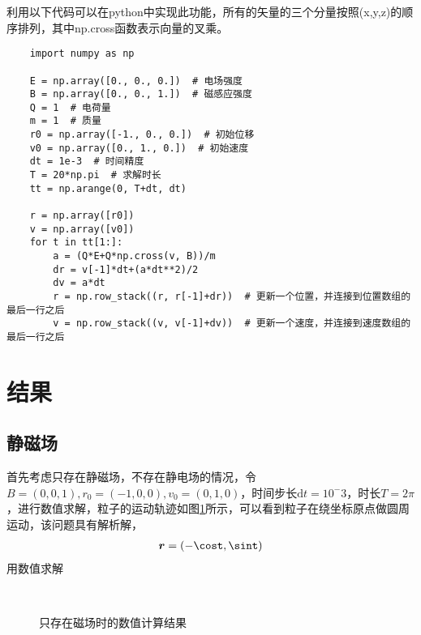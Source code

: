 \documentclass{article} %
\renewcommand{\vec}[1]{\boldsymbol{#1}} %
\begin{document}
利用以下代码可以在python中实现此功能，所有的矢量的三个分量按照(x,y,z)的顺序排列，其中np.cross函数表示向量的叉乘。
\begin{lstlisting}
    import numpy as np
    
    E = np.array([0., 0., 0.])  # 电场强度
    B = np.array([0., 0., 1.])  # 磁感应强度
    Q = 1  # 电荷量
    m = 1  # 质量
    r0 = np.array([-1., 0., 0.])  # 初始位移
    v0 = np.array([0., 1., 0.])  # 初始速度
    dt = 1e-3  # 时间精度
    T = 20*np.pi  # 求解时长
    tt = np.arange(0, T+dt, dt)
    
    r = np.array([r0])
    v = np.array([v0])
    for t in tt[1:]:
        a = (Q*E+Q*np.cross(v, B))/m
        dr = v[-1]*dt+(a*dt**2)/2
        dv = a*dt
        r = np.row_stack((r, r[-1]+dr))  # 更新一个位置，并连接到位置数组的最后一行之后
        v = np.row_stack((v, v[-1]+dv))  # 更新一个速度，并连接到速度数组的最后一行之后
    \end{lstlisting}

\section{结果}

\subsection{静磁场}
首先考虑只存在静磁场，不存在静电场的情况，令$B=(0,0,1),r_0=(-1,0,0),v_0=(0,1,0)$，时间步长$\mathrm{d}t=10^-3$，时长$T=2\pi$，进行数值求解，粒子的运动轨迹如图\ref{F2}所示，可以看到粒子在绕坐标原点做圆周运动，该问题具有解析解，
\begin{align}
    \vec{r}=(-\cost,\sint)
\end{align}
用数值求解
\begin{figure}
    \\
    \caption{只存在磁场时的数值计算结果}
    \label{F2}
\end{figure}
\end{document}
